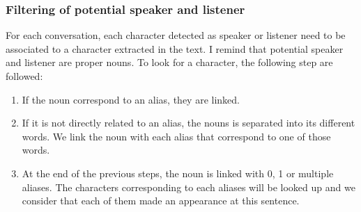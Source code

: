 \documentclass[a4paper, 12pt]{report}
\begin{document}
\subsubsection{Filtering of potential speaker and listener}
\label{filtering}
For each conversation, each character detected as speaker or listener need to be associated to a character extracted in the text. I remind that potential speaker and listener are proper nouns. To look for a character, the following step are followed:\\
\begin{enumerate}
\item If the noun correspond to an alias, they are linked.
\item If it is not directly related to an alias, the nouns is separated into its different words. We link the noun with each alias that correspond to one of those words.
\item At the end of the previous steps, the noun is linked with 0, 1 or multiple aliases. The characters corresponding to each aliases will be looked up and we consider that each of them made an appearance at  this sentence.
\end{enumerate}
\end{document}
